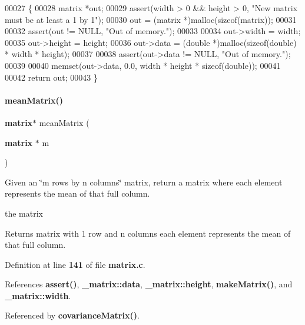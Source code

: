 \begin{DoxyCode}
00027                                           \{
00028   matrix *out;
00029   assert(width > 0 && height > 0, \textcolor{stringliteral}{"New matrix must be at least a 1 by 1"});
00030   out = (matrix *)malloc(\textcolor{keyword}{sizeof}(matrix));
00031 
00032   assert(out != NULL, \textcolor{stringliteral}{"Out of memory."});
00033 
00034   out->width = width;
00035   out->height = height;
00036   out->data = (\textcolor{keywordtype}{double} *)malloc(\textcolor{keyword}{sizeof}(\textcolor{keywordtype}{double}) * width * height);
00037 
00038   assert(out->data != NULL, \textcolor{stringliteral}{"Out of memory."});
00039 
00040   memset(out->data, 0.0, width * height * \textcolor{keyword}{sizeof}(\textcolor{keywordtype}{double}));
00041 
00042   \textcolor{keywordflow}{return} out;
00043 \}
\end{DoxyCode}
\mbox{\label{a00041_ae4babf9b518a2d5d6b12776191e3b7de}} 
\paragraph{mean\+Matrix()}
{\footnotesize\ttfamily \textbf{ matrix}$\ast$ mean\+Matrix (\begin{DoxyParamCaption}\item[{\textbf{ matrix} $\ast$}]{m }\end{DoxyParamCaption})}



Given an \char`\"{}m rows by n columns\char`\"{} matrix, return a matrix where each element represents the mean of that full column. 

the matrix \begin{DoxyReturn}{Returns}
matrix with 1 row and n columns each element represents the mean of that full column. 
\end{DoxyReturn}


Definition at line \textbf{ 141} of file \textbf{ matrix.\+c}.



References \textbf{ assert()}, \textbf{ \+\_\+matrix\+::data}, \textbf{ \+\_\+matrix\+::height}, \textbf{ make\+Matrix()}, and \textbf{ \+\_\+matrix\+::width}.



Referenced by \textbf{ covariance\+Matrix()}.


